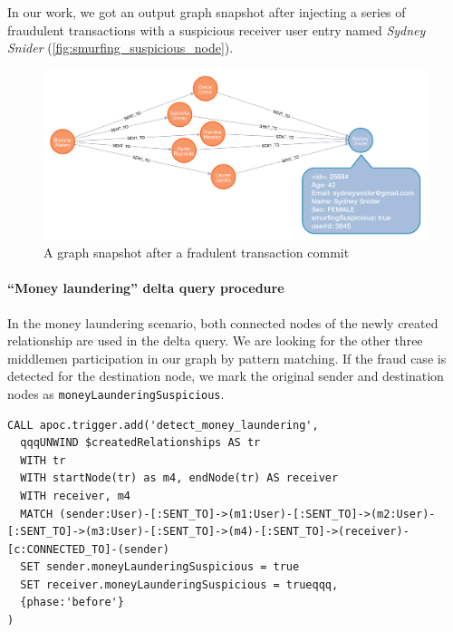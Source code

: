 In our work, we got an output graph snapshot after injecting a series of fraudulent transactions with a suspicious receiver user entry named \textit{Sydney Snider} (\autoref{fig:smurfing_suspicious_node}).

\begin{figure}[!ht]
  \centering
  \includegraphics[width=\textwidth]{figures/smurfing_suspicious_node.png}
  \caption{A graph snapshot after a fradulent transaction commit} 
  \label{fig:smurfing_suspicious_node}
\end{figure}

\paragraph{``Money laundering'' delta query procedure}

In the money laundering scenario, both connected nodes of the newly created relationship are used in the delta query.
We are looking for the other three middlemen participation in our graph by pattern matching.
If the fraud case is detected for the destination node, we mark the original sender and destination nodes as \texttt{moneyLaunderingSuspicious}.

\begin{lstlisting}[language=Cypher,frame=single,caption={Money laundering delta query procedure},label={lst:money_laundering_delta_query}]
CALL apoc.trigger.add('detect_money_laundering',
  qqqUNWIND $createdRelationships AS tr
  WITH tr
  WITH startNode(tr) as m4, endNode(tr) AS receiver
  WITH receiver, m4
  MATCH (sender:User)-[:SENT_TO]->(m1:User)-[:SENT_TO]->(m2:User)-[:SENT_TO]->(m3:User)-[:SENT_TO]->(m4)-[:SENT_TO]->(receiver)-[c:CONNECTED_TO]-(sender)
  SET sender.moneyLaunderingSuspicious = true
  SET receiver.moneyLaunderingSuspicious = trueqqq,
  {phase:'before'}
)
\end{lstlisting}
   
